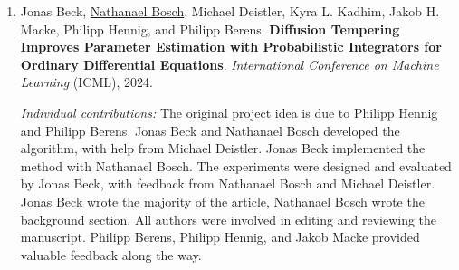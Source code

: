 \documentclass{mimosis}
\begin{document}
\begin{enumerate}[label=\Roman*]
\item
\hypertarget{tempering}{
Jonas Beck, \underline{Nathanael Bosch}, Michael Deistler, Kyra L. Kadhim, Jakob H. Macke, Philipp Hennig, and Philipp Berens.
\textbf{Diffusion Tempering Improves Parameter Estimation with Probabilistic Integrators for Ordinary Differential Equations}.
\emph{International Conference on Machine Learning}
(ICML),
2024.
}
\par \emph{Individual contributions:}
The original project idea is due to Philipp Hennig and Philipp Berens.
Jonas Beck and Nathanael Bosch developed the algorithm, with help from Michael Deistler.
Jonas Beck implemented the method with Nathanael Bosch.
The experiments were designed and evaluated by Jonas Beck,
with feedback from Nathanael Bosch and Michael Deistler.
Jonas Beck wrote the majority of the article,
Nathanael Bosch wrote the background section.
All authors were involved in editing and reviewing the manuscript.
Philipp Berens, Philipp Hennig, and Jakob Macke provided valuable feedback along the way.


\end{enumerate}
\end{document}
